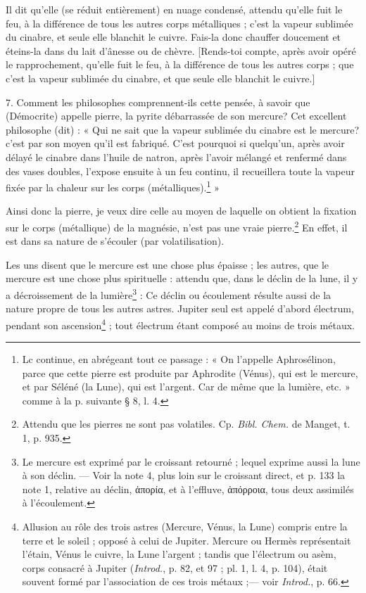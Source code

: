 \documentclass[a4paper, 11pt, oneside, polutonikogreek, french]{article}
\begin{document}
Il dit qu'elle (se réduit entièrement) en nuage condensé, attendu qu'elle fuit le feu, à la différence de tous les autres corps métalliques ; c'est la vapeur sublimée du cinabre, et seule elle blanchit le cuivre. Fais-la donc chauffer doucement et éteins-la dans du lait d'ânesse ou de chèvre. [Rends-toi compte, après avoir opéré le rapprochement, qu'elle fuit le feu, à la différence de tous les autres corps ; que c'est la vapeur sublimée du cinabre, et que seule elle blanchit le cuivre.]

7. Comment les philosophes comprennent-ils cette pensée, à savoir que (Démocrite) appelle pierre, la pyrite débarrassée de son mercure? Cet excellent philosophe (dit) : « Qui ne sait que la vapeur sublimée du cinabre est le mercure? c'est par son moyen qu'il est fabriqué. C'est pourquoi si quelqu'un, après avoir délayé le cinabre dans l'huile de natron, après l'avoir mélangé et renfermé dans des vases doubles, l'expose ensuite à un feu continu, il recueillera toute la vapeur fixée par la chaleur sur les corps (métalliques).\footnote{Lc continue, en abrégeant tout ce passage : « On l'appelle Aphrosélinon, parce que cette pierre est produite par Aphrodite (Vénus), qui est le mercure, et par Séléné (la Lune), qui est l'argent. Car de même que la lumière, etc. » comme à la p. suivante § 8, l. 4.} »

Ainsi donc la pierre, je veux dire celle au moyen de laquelle on obtient la fixation sur le corps (métallique) de la magnésie, n'est pas une vraie pierre.\footnote{Attendu que les pierres ne sont pas volatiles. Cp. \emph{Bibl. Chem.} de Manget, t. 1, p. 935.} En effet, il est dans sa nature de s'écouler (par volatilisation).

Les uns disent que le mercure est une chose plus épaisse ; les autres, que le mercure est une chose plus spirituelle : attendu que, dans le déclin de la lune, il y a décroissement de la lumière\footnote{Le mercure est exprimé par le croissant retourné ; lequel exprime aussi la lune à son déclin. --- Voir la note 4, plus loin sur le croissant direct, et p. 133 la note 1, relative au déclin, ἀπορία, et à l'effluve, ἀπόρροια, tous deux assimilés à l'écoulement.} : Ce déclin ou écoulement résulte aussi de la nature propre de tous les autres astres. Jupiter seul est appelé d'abord électrum, pendant son ascension\footnote{Allusion au rôle des trois astres (Mercure, Vénus, la Lune) compris entre la terre et le soleil ; opposé à celui de Jupiter. Mercure ou Hermès représentait l'étain, Vénus le cuivre, la Lune l'argent ; tandis que l'électrum ou asèm, corps consacré à Jupiter (\emph{Introd.}, p. 82, et 97 ; pl. 1, l. 4, p. 104), était souvent formé par l'association de ces trois métaux ;--- voir \emph{Introd.}, p. 66.} ; tout électrum étant composé au moins de trois métaux.
\end{document}
